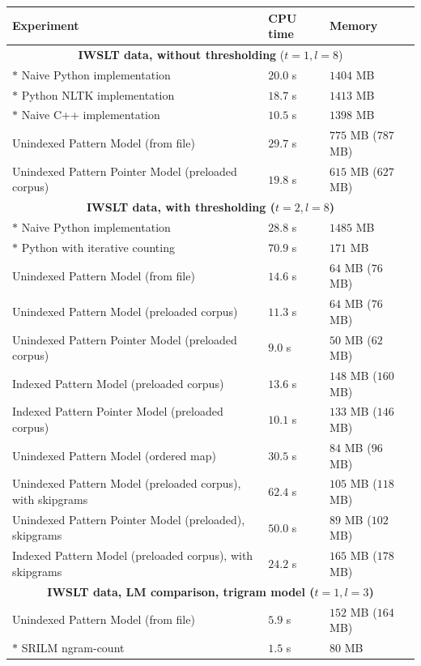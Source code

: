 \begin{table}[h]
\footnotesize{
\begin{tabular}{lll}
Experiment & CPU time & Memory  \\
\hline
\multicolumn{3}{c}{\textbf{IWSLT data, without thresholding} ($t=1,l=8$)} \\
\hline
$\ast$ Naive Python implementation & $20.0$ s & $1404$ MB \\
$\ast$ Python NLTK implementation & $18.7$ s & $1413$ MB \\
$\ast$ Naive C++ implementation  & $10.5$ s & $1398$ MB \\
Unindexed Pattern Model (from file) & $29.7$ s & $775$ MB ($787$ MB) \\
Unindexed Pattern Pointer Model (preloaded corpus) & $19.8$ s & $615$ MB ($627$ MB) \\
\hline
\multicolumn{3}{c}{\textbf{IWSLT data, with thresholding ($t=2,l=8$)}} \\
\hline
$\ast$ Naive Python implementation & $28.8$ s & $1485$ MB \\
$\ast$ Python with iterative counting  & $70.9$ s & $171$ MB \\
Unindexed Pattern Model (from file) & $14.6$ s & $64$ MB ($76$ MB) \\
Unindexed Pattern Model (preloaded corpus) & $11.3$ s & $64$ MB ($76$ MB) \\
Unindexed Pattern Pointer Model (preloaded corpus)  & $9.0$ s & $50$ MB ($62$ MB) \\
Indexed Pattern Model (preloaded corpus) & $13.6$ s & $148$ MB ($160$ MB) \\
Indexed Pattern Pointer Model (preloaded corpus) & $10.1$ s & $133$ MB ($146$ MB) \\
Unindexed Pattern Model (ordered map) & $30.5$ s & $84$ MB ($96$ MB) \\
\hline
Unindexed Pattern Model (preloaded corpus), with skipgrams & $62.4$ s & $105$ MB ($118$ MB) \\
Unindexed Pattern Pointer Model (preloaded), skipgrams  & $50.0$ s & $89$ MB ($102$ MB) \\
Indexed Pattern Model (preloaded corpus), with skipgrams & $24.2$ s & $165$ MB ($178$ MB) \\
\hline
\multicolumn{3}{c}{\textbf{IWSLT data, LM comparison, trigram model ($t=1,l=3$)}} \\
\hline
Unindexed Pattern Model (from file) & $5.9$ s & $152$ MB ($164$ MB) \\
$\ast$ SRILM ngram-count & $1.5$ s & $80$ MB  \\

\end{tabular}}
\end{table}
